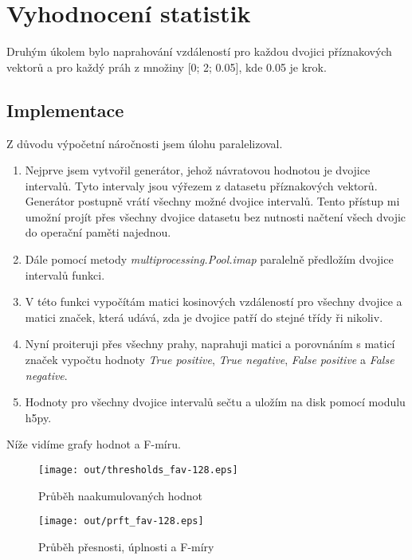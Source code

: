 \documentclass[11pt]{article}
\begin{document}
    \section{Vyhodnocení statistik}\label{sec:statistics}
    Druhým úkolem bylo naprahování vzdáleností pro každou dvojici příznakových vektorů a pro každý práh z množiny
    [0; 2; 0.05], kde 0.05 je krok.

    \subsection{Implementace}\label{subsec:implementaceprahovani}
    Z důvodu výpočetní náročnosti jsem úlohu paralelizoval.

    \begin{enumerate}
        \item Nejprve jsem vytvořil generátor, jehož návratovou hodnotou je dvojice intervalů.
        Tyto intervaly jsou výřezem z datasetu příznakových vektorů.
        Generátor postupně vrátí všechny možné dvojice intervalů.
        Tento přístup mi umožní projít přes všechny dvojice datasetu bez nutnosti načtení všech dvojic do operační
        paměti najednou.
        \item Dále pomocí metody \textit{multiprocessing.Pool.imap} paralelně předložím dvojice intervalů funkci.
        \item V této funkci vypočítám matici kosinových vzdáleností pro všechny dvojice a matici značek, která udává,
        zda je dvojice patří do stejné třídy ři nikoliv.
        \item Nyní proiteruji přes všechny prahy, naprahuji matici a porovnáním s maticí značek vypočtu hodnoty
        \textit{True positive}, \textit{True negative}, \textit{False positive} a \textit{False negative}.
        \item Hodnoty pro všechny dvojice intervalů sečtu a uložím na disk pomocí modulu h5py.
    \end{enumerate}

    Níže vidíme grafy hodnot a F-míru.

    \begin{figure}[H]
        \centering
        \texttt{[image: out/thresholds\_fav-128.eps]}
        \caption{Průběh naakumulovaných hodnot}
        \label{fig:thresh}
    \end{figure}

    \newpage

    \begin{figure}[H]
        \centering
        \texttt{[image: out/prft\_fav-128.eps]}
        \caption{Průběh přesnosti, úplnosti a F-míry}
        \label{fig:prft}
    \end{figure}
\end{document}
